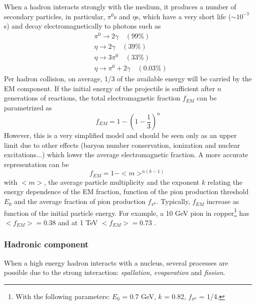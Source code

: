 When a hadron interacts strongly with the medium, it produces a number of secondary particles, in particular, $\pi^0$s and $\eta$s, which have a very short life ($\sim 10^{-7}$s) and decay electromagnetically to photons such as
\begin{equation*}
  \begin{aligned}
    &\pi^0 \rightarrow 2\gamma \quad (99\%)\\
    &\eta \rightarrow 2\gamma \quad (39\%)\\
    &\eta \rightarrow 3\pi^0 \quad (33\%)\\
    &\eta \rightarrow \pi^0 + 2\gamma \quad (0.03\%)
  \end{aligned}
\end{equation*}
Per hadron collision, on average, 1/3 of the available energy will be carried by the EM component. If the initial energy of the projectile is sufficient after $n$ generations of reactions, the total electromagnetic fraction $f_{EM}$ can be parametrized as \cite{Wigmans:392793}
\begin{equation}
  f_{EM} = 1 - (1 - \frac{1}{3})^n
\end{equation}
However, this is a very simplified model and should be seen only as an upper limit due to other effects (baryon number conservation, ionization and nuclear excitations...) which lower the average electromagnetic fraction. A more accurate representation can be \cite{Wigmans:392793}
\begin{equation}
  f_{EM} = 1 - <m>^{n(k-1)}
\end{equation}
with $<m>$, the average particle multiplicity and the exponent $k$ relating the energy dependence of the EM fraction, function of the pion production threshold $E_0$ and the average fraction of pion production $f_{\pi^0}$. Typically, $f_{EM}$ increase as function of the initial particle energy. For example, a 10 GeV pion in copper\footnote{With the following parameters: $E_0$ = 0.7 GeV, $k$ = 0.82, $f_{\pi^0}$ = 1/4.} has $<f_{EM}> = 0.38$ and at 1 TeV $<f_{EM}> = 0.73$ \cite{Wigmans:392793}.

\subsubsection{Hadronic component}
\label{subsubsec:HadComp}

When a high energy hadron interacts with a nucleus, several processes are possible due to the strong interaction: \textit{spallation}, \textit{evaporation} and \textit{fission}.

